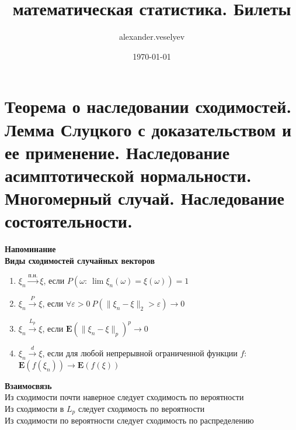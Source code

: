 \documentclass[25pt]{article}
\title{математическая статистика. Билеты}
\author{alexander.veselyev }
\date{\today}
\begin{document}
\section{Теорема о наследовании сходимостей. Лемма Слуцкого с доказательством и ее применение. Наследование асимптотической нормальности. Многомерный случай. Наследование состоятельности.}

\textbf{Напоминание}
\\
\textbf{Виды сходимостей случайных векторов}
\begin{enumerate}
    \item $\xi_n \xrightarrow{\text{п.н.}} \xi$, если $P(\omega:\ \lim \xi_n(\omega) = \xi(\omega)) = 1$
    \item  $\xi_n \xrightarrow{P} \xi$, если $\forall \varepsilon > 0 \ P(\|\xi_n - \xi\|_2 > \varepsilon) \rightarrow 0$
    \item  $\xi_n \xrightarrow{L_p} \xi$, если $\mathbf{E}(\|\xi_n-\xi\|_p)^p \rightarrow 0 $
    \item  $\xi_n \xrightarrow{d} \xi$, если для любой непрерывной ограниченной функции $f$: 
    $\mathbf{E}(f(\xi_n)) \rightarrow \textbf{E}(f(\xi))$
\end{enumerate}
\textbf{Взаимосвязь} \\
Из сходимости почти наверное следует сходимость по вероятности
\\
Из сходимости в $L_p$ следует сходимость по вероятности
\\
Из сходимости по вероятности следует сходимость по распределению
\\ \\ \\ 
\end{document}
